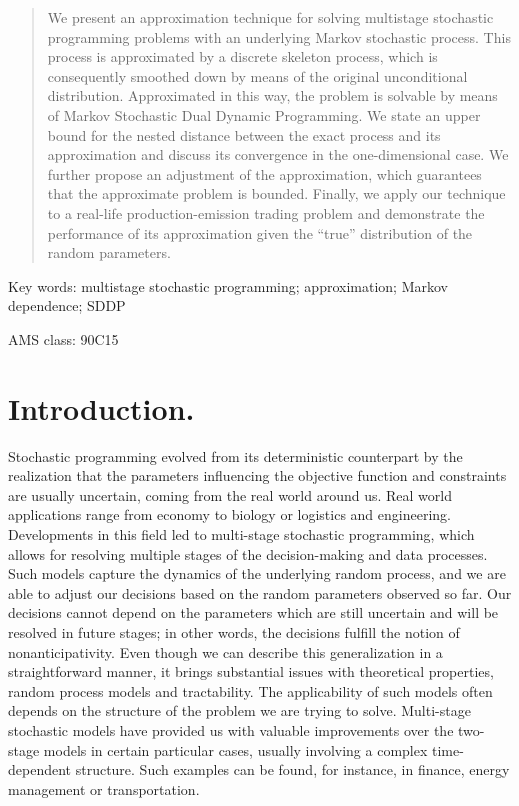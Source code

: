 \documentclass{article}              %
\begin{document}

\maketitle
\begin{abstract}
We present an approximation technique for solving multistage stochastic programming problems with an underlying Markov stochastic process. This process is approximated by a discrete skeleton process, which is consequently smoothed down by means of the original unconditional distribution. Approximated in this way, the problem is solvable by means of Markov Stochastic Dual Dynamic Programming. We state an upper bound for the nested distance between the exact process and its approximation and discuss its convergence in the one-dimensional case. We further propose an adjustment of the approximation, which guarantees that the approximate problem is bounded. Finally, we apply our technique to a real-life  production-emission trading problem and demonstrate the performance of its approximation given the ``true'' distribution of the random parameters.
\end{abstract}

\noindent Key words: multistage stochastic programming; approximation; Markov dependence; SDDP

\noindent AMS class: 90C15

\section{Introduction.}

Stochastic programming evolved from its deterministic counterpart by the realization that the parameters influencing the objective function and constraints are usually uncertain, coming from the real world around us. Real world applications range from economy to biology or logistics and engineering. Developments in this field led to multi-stage stochastic programming, which allows for resolving multiple stages of the decision-making and data processes. Such models capture the dynamics of the underlying random process, and we are able to adjust our decisions based on the random parameters observed so far. Our decisions cannot depend on the parameters which are still uncertain and will be resolved in future stages; in other words, the decisions fulfill the notion of nonanticipativity. Even though we can describe this generalization in a straightforward manner, it brings substantial issues with theoretical properties, random process models and tractability. The applicability of such models often depends on the structure of the problem we are trying to solve. Multi-stage stochastic models have provided us with valuable improvements over the two-stage models in certain particular cases, usually involving a complex time-dependent structure. Such examples can be found, for instance, in finance, energy management or transportation.
\end{document}
